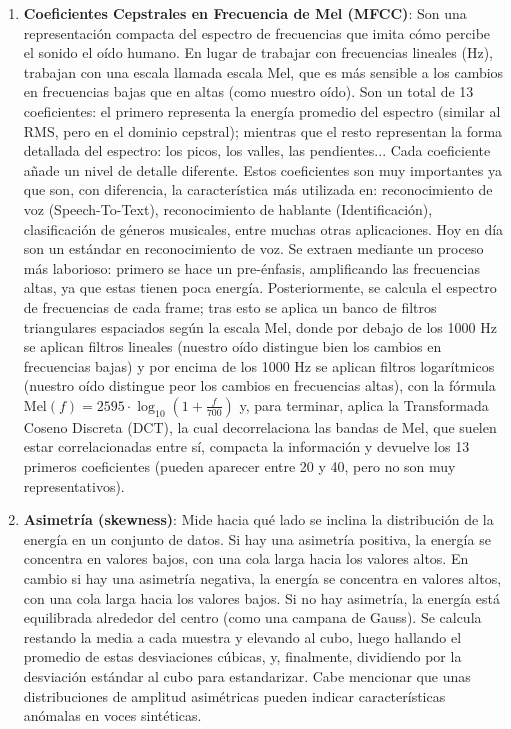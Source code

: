 \begin{enumerate}
	\item \textbf{Coeficientes Cepstrales en Frecuencia de Mel (MFCC)}: Son una representación compacta del espectro de frecuencias que imita cómo percibe el sonido el oído humano. En lugar de trabajar con frecuencias lineales (Hz), trabajan con una escala llamada escala Mel, que es más sensible a los cambios en frecuencias bajas que en altas (como nuestro oído). Son un total de 13 coeficientes: el primero representa la energía promedio del espectro (similar al RMS, pero en el dominio cepstral); mientras que el resto representan la forma detallada del espectro: los picos, los valles, las pendientes... Cada coeficiente añade un nivel de detalle diferente. Estos coeficientes son muy importantes ya que son, con diferencia, la característica más utilizada en: reconocimiento de voz (Speech-To-Text), reconocimiento de hablante (Identificación), clasificación de géneros musicales, entre muchas otras aplicaciones. Hoy en día son un estándar en reconocimiento de voz. Se extraen mediante un proceso más laborioso: primero se hace un pre-énfasis, amplificando las frecuencias altas, ya que estas tienen poca energía. Posteriormente, se calcula el espectro de frecuencias de cada frame; tras esto se aplica un banco de filtros triangulares espaciados según la escala Mel, donde por debajo de los 1000 Hz se aplican filtros lineales (nuestro oído distingue bien los cambios en frecuencias bajas) y por encima de los 1000 Hz se aplican filtros logarítmicos (nuestro oído distingue peor los cambios en frecuencias altas), con la fórmula $\text{Mel}(f) = 2595 \cdot \log_{10}\left(1 + \frac{f}{700}\right)$ y, para terminar, aplica la Transformada Coseno Discreta (DCT), la cual decorrelaciona las bandas de Mel, que suelen estar correlacionadas entre sí, compacta la información y devuelve los 13 primeros coeficientes (pueden aparecer entre 20 y 40, pero no son muy representativos).
	\item \textbf{Asimetría (skewness)}: Mide hacia qué lado se inclina la distribución de la energía en un conjunto de datos. Si hay una asimetría positiva, la energía se concentra en valores bajos, con una cola larga hacia los valores altos. En cambio si hay una asimetría negativa, la energía se concentra en valores altos, con una cola larga hacia los valores bajos. Si no hay asimetría, la energía está equilibrada alrededor del centro (como una campana de Gauss). Se calcula restando la media a cada muestra y elevando al cubo, luego hallando el promedio de estas desviaciones cúbicas, y, finalmente, dividiendo por la desviación estándar al cubo para estandarizar. Cabe mencionar que unas distribuciones de amplitud asimétricas pueden indicar características anómalas en voces sintéticas.

\end{enumerate}
